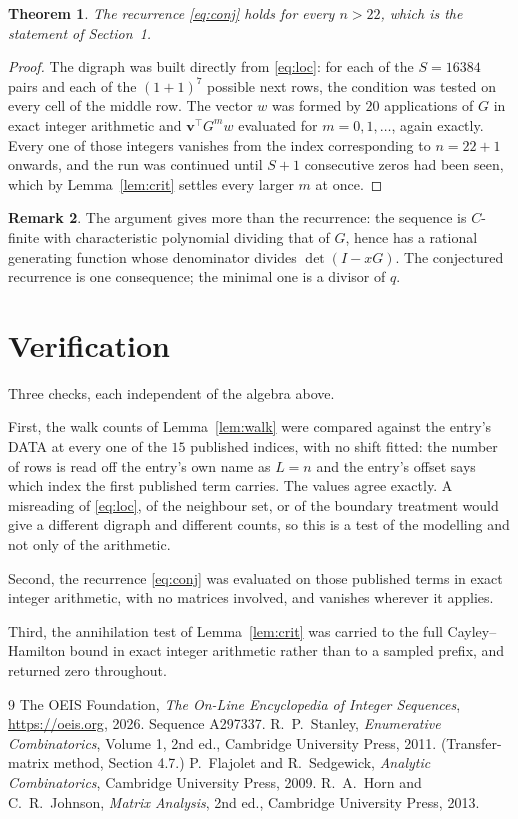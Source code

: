 \documentclass[11pt,a4paper]{article}
\theoremstyle{plain}
\newtheorem{theorem}{Theorem}
\theoremstyle{definition}
\newtheorem{remark}[theorem]{Remark}
\begin{document}
\begin{theorem}
The recurrence \eqref{eq:conj} holds for every $n>22$, which is the statement of
Section~1.
\end{theorem}

\begin{proof}
The digraph was built directly from \eqref{eq:loc}: for each of the $S=16384$ pairs and each
of the $(1+1)^{7}$ possible next rows, the condition was tested on every cell of
the middle row. The vector $w$ was formed by $20$ applications of $G$ in exact integer
arithmetic and $\mathbf{v}^{\!\top}G^{m}w$ evaluated for $m=0,1,\dots$, again exactly.
Every one of those integers vanishes from the index corresponding to $n=22+1$ onwards,
and the run was continued until $S+1$ consecutive zeros had been seen, which by
Lemma~\ref{lem:crit} settles every larger $m$ at once.
\end{proof}

\begin{remark}
The argument gives more than the recurrence: the sequence is $C$-finite with characteristic
polynomial dividing that of $G$, hence has a rational generating function whose denominator
divides $\det(I-xG)$. The conjectured recurrence is one consequence; the minimal one is a
divisor of $q$.
\end{remark}

\section{Verification}

Three checks, each independent of the algebra above.

First, the walk counts of Lemma~\ref{lem:walk} were compared against the entry's DATA at
every one of the $15$ published indices, with no shift fitted: the number of rows is
read off the entry's own name as $L=n$ and the entry's offset says which index the first
published term carries. The values agree exactly. A misreading of \eqref{eq:loc}, of the
neighbour set, or of the boundary treatment would give a different digraph and different
counts, so this is a test of the modelling and not only of the arithmetic.

Second, the recurrence \eqref{eq:conj} was evaluated on those published terms in exact
integer arithmetic, with no matrices involved, and vanishes wherever it applies.

Third, the annihilation test of Lemma~\ref{lem:crit} was carried to the full
Cayley--Hamilton bound in exact integer arithmetic rather than to a sampled prefix, and
returned zero throughout.

\begin{thebibliography}{9}
 The OEIS Foundation, \emph{The On-Line Encyclopedia of Integer
Sequences}, \url{https://oeis.org}, 2026. Sequence A297337.
 R.~P.~Stanley, \emph{Enumerative Combinatorics}, Volume 1, 2nd ed.,
Cambridge University Press, 2011. (Transfer-matrix method, Section 4.7.)
 P.~Flajolet and R.~Sedgewick, \emph{Analytic Combinatorics}, Cambridge
University Press, 2009.
 R.~A.~Horn and C.~R.~Johnson, \emph{Matrix Analysis}, 2nd ed., Cambridge
University Press, 2013.
\end{thebibliography}
\end{document}
